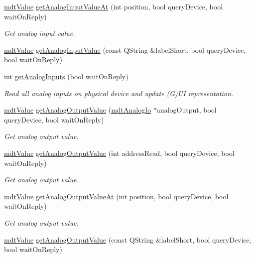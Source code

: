 \begin{DoxyCompactItemize}
\hyperlink{classmdt_value}{mdt\-Value} \hyperlink{classmdt_device_ae2bc364104f843b037bbbf8aa8a37d8e}{get\-Analog\-Input\-Value\-At} (int position, bool query\-Device, bool wait\-On\-Reply)
\begin{DoxyCompactList}\small\item\em Get analog input value. \end{DoxyCompactList}\item 
\hyperlink{classmdt_value}{mdt\-Value} \hyperlink{classmdt_device_a66a4c466dd6cb5c8235850f6dc23ae7b}{get\-Analog\-Input\-Value} (const Q\-String \&label\-Short, bool query\-Device, bool wait\-On\-Reply)
\item 
int \hyperlink{classmdt_device_a98cba3132db15317daf54eb701388e91}{get\-Analog\-Inputs} (bool wait\-On\-Reply)
\begin{DoxyCompactList}\small\item\em Read all analog inputs on physical device and update (G)U\-I representation. \end{DoxyCompactList}\item 
\hyperlink{classmdt_value}{mdt\-Value} \hyperlink{classmdt_device_a163ee286d905feafe50b3e4351d4bf41}{get\-Analog\-Output\-Value} (\hyperlink{classmdt_analog_io}{mdt\-Analog\-Io} $\ast$analog\-Output, bool query\-Device, bool wait\-On\-Reply)
\begin{DoxyCompactList}\small\item\em Get analog output value. \end{DoxyCompactList}\item 
\hyperlink{classmdt_value}{mdt\-Value} \hyperlink{classmdt_device_aa90eb1111d6778f4227224d3b1804ae7}{get\-Analog\-Output\-Value} (int address\-Read, bool query\-Device, bool wait\-On\-Reply)
\begin{DoxyCompactList}\small\item\em Get analog output value. \end{DoxyCompactList}\item 
\hyperlink{classmdt_value}{mdt\-Value} \hyperlink{classmdt_device_ae3776f8a9215c799781e701798927f0c}{get\-Analog\-Output\-Value\-At} (int position, bool query\-Device, bool wait\-On\-Reply)
\begin{DoxyCompactList}\small\item\em Get analog output value. \end{DoxyCompactList}\item 
\hyperlink{classmdt_value}{mdt\-Value} \hyperlink{classmdt_device_ad6bfbab4c93bc0136068e773dd776010}{get\-Analog\-Output\-Value} (const Q\-String \&label\-Short, bool query\-Device, bool wait\-On\-Reply)

\end{DoxyCompactItemize}
